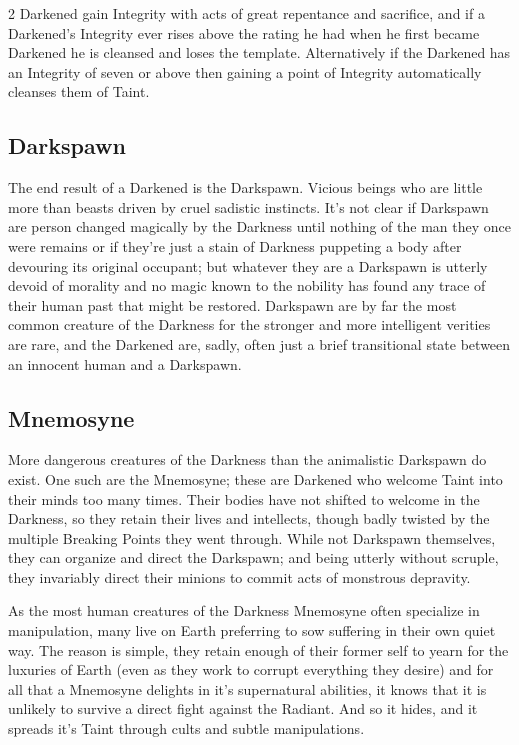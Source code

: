\begin{multicols}{2}
Darkened gain Integrity with acts of great repentance and sacrifice, and if a Darkened's Integrity ever rises above the rating he had when he first became Darkened he is cleansed and loses the template. Alternatively if the Darkened has an Integrity of seven or above then gaining a point of Integrity automatically cleanses them of Taint. 

\subsection*{Darkspawn}

The end result of a Darkened is the Darkspawn. Vicious beings who are little more than beasts driven by cruel sadistic instincts. It's not clear if Darkspawn are person changed magically by the Darkness until nothing of the man they once were remains or if they're just a stain of Darkness puppeting a body after devouring its original occupant; but whatever they are a Darkspawn is utterly devoid of morality and no magic known to the nobility has found any trace of their human past that might be restored. Darkspawn are by far the most common creature of the Darkness for the stronger and more intelligent verities are rare, and the Darkened are, sadly, often just a brief transitional state between an innocent human and a Darkspawn. 

\subsection*{Mnemosyne}
More dangerous creatures of the Darkness than the animalistic Darkspawn do exist. One such are the Mnemosyne; these are Darkened who welcome Taint into their minds too many times. Their bodies have not shifted to welcome in the Darkness, so they retain their lives and intellects, though badly twisted by the multiple Breaking Points they went through. While not Darkspawn themselves, they can organize and direct the Darkspawn; and being utterly without scruple, they invariably direct their minions to commit acts of monstrous depravity.

As the most human creatures of the Darkness Mnemosyne often specialize in manipulation, many live on Earth preferring to sow suffering in their own quiet way. The reason is simple, they retain enough of their former self to yearn for the luxuries of Earth (even as they work to corrupt everything they desire) and for all that a Mnemosyne delights in it's supernatural abilities, it knows that it is unlikely to survive a direct fight against the Radiant. And so it hides, and it spreads it's Taint through cults and subtle manipulations.


\end{multicols}

